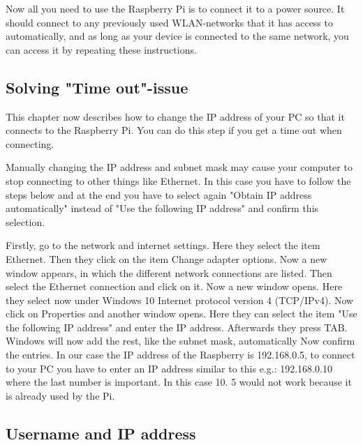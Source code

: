 \medskip


\medskip

Now all you need to use the Raspberry Pi is to connect it to a power source. It should connect to any previously used WLAN-networks that it has access to automatically, and as long as your device is connected to the same network, you can access it by repeating these instructions.



\subsection{Solving "Time out"-issue}
\label{sec:changeIP}

This chapter now describes how to change the IP address of your PC so that it connects to the Raspberry Pi. You can do this step if you get a time out when connecting.

\begin{notes}
	\item Manually changing the IP address and subnet mask may cause your computer to stop connecting to other things like Ethernet. In this case you have to follow the steps below and at the end you have to select again "Obtain IP address automatically" instead of "Use the following IP address" and confirm this selection.
\end{notes}

Firstly, go to the network and internet settings. Here they select the item Ethernet. Then they click on the item Change adapter options. Now a new window appears, in which the different network connections are listed. Then select the Ethernet connection and click on it. Now a new window opens. Here they select now under Windows 10 Internet protocol version 4 (TCP/IPv4). Now click on Properties and another window opens. Here they can select the item "Use the following IP address" and enter the IP address. Afterwards they press TAB. Windows will now add the rest, like the subnet mask, automatically Now confirm the entries. In our case the IP address of the Raspberry is 192.168.0.5, to connect to your PC you have to enter an IP address similar to this e.g.: 192.168.0.10 where the last number is important. In this case 10. 5 would not work because it is already used by the Pi.


\subsection{Username and IP address}
\label{sec:user&IP}

